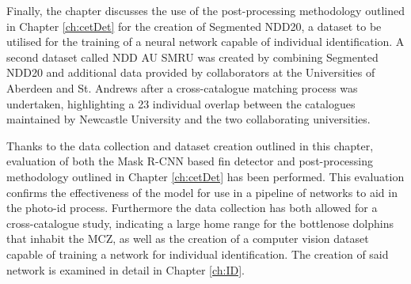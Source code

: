 Finally, the chapter discusses the use of the post-processing methodology outlined in Chapter \ref{ch:cetDet} for the creation of Segmented NDD20, a dataset to be utilised for the training of a neural network capable of individual identification. A second dataset called NDD AU SMRU was created by combining Segmented NDD20 and additional data provided by collaborators at the Universities of Aberdeen and St. Andrews after a cross-catalogue matching process was undertaken, highlighting a 23 individual overlap between the catalogues maintained by Newcastle University and the two collaborating universities.

Thanks to the data collection and dataset creation outlined in this chapter, evaluation of both the Mask R-CNN based fin detector and post-processing methodology outlined in Chapter \ref{ch:cetDet} has been performed. This evaluation confirms the effectiveness of the model for use in a pipeline of networks to aid in the photo-id process. Furthermore the data collection has both allowed for a cross-catalogue study, indicating a large home range for the bottlenose dolphins that inhabit the MCZ, as well as the creation of a computer vision dataset capable of training a network for individual identification. The creation of said network is examined in detail in Chapter \ref{ch:ID}. 

